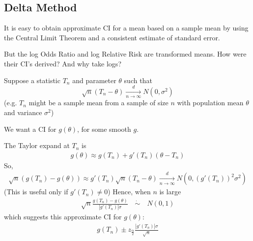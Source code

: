\documentclass[11pt]{elegantbook}
\begin{document}
\subsection{Delta Method}
It is easy to obtain approximate CI for a mean based on a sample mean by using the Central Limit Theorem and a consistent estimate of standard error.

But the log Odds Ratio and log Relative Risk are transformed means. How were their CI's derived? And why take logs?

Suppose a statistic $T_n$ and parameter $\theta$ such that
$$
\sqrt{n}\left(T_n-\theta\right) \underset{n \rightarrow \infty}{\stackrel{d}{\longrightarrow}} N\left(0, \sigma^2\right)
$$
(e.g. $T_n$ might be a sample mean from a sample of size $n$ with population mean $\theta$ and variance $\sigma^2$)

We want a CI for $g(\theta)$, for some smooth $g$.

The Taylor expand at $T_n$ is
\begin{equation}
    \begin{aligned}
        g(\theta)\approx g(T_n)+g'(T_n)(\theta-T_n)
    \end{aligned}
    \nonumber
\end{equation}
So,
\begin{equation}
    \begin{aligned}
        \sqrt{n}(g(T_n)-g(\theta))\approx g'(T_n)\sqrt{n}(T_n-\theta)\underset{n \rightarrow \infty}{\stackrel{d}{\longrightarrow}} N\left(0, (g'(T_n))^2\sigma^2\right)
    \end{aligned}
    \nonumber
\end{equation}
(This is useful only if $g'(T_n)\neq 0$)
Hence, when $n$ is large
\begin{equation}
    \begin{aligned}
        \sqrt{n}\frac{g(T_n)-g(\theta)}{|g'(T_n)|\sigma} \quad \dot{\sim}\quad  N(0,1)
    \end{aligned}
    \nonumber
\end{equation}
which suggests this approximate CI for $g(\theta)$:
\begin{equation}
    \begin{aligned}
        g(T_n)\pm z_{\frac{\alpha}{2}}\frac{|g'(T_n)|\sigma}{\sqrt{n}}
    \end{aligned}
    \nonumber
\end{equation}
\end{document}
